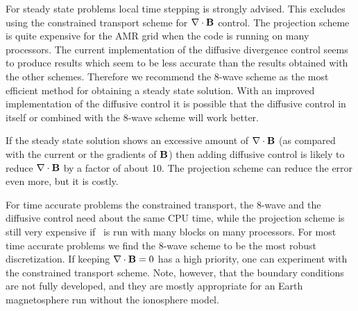 For steady state problems local time stepping is strongly 
advised. This excludes using the constrained transport scheme
for $\nabla\cdot\mathbf{B}$ control. The projection scheme is quite expensive
for the AMR grid when the code is running on many processors.
The current implementation of the diffusive divergence control
seems to produce results which seem to be less accurate than the
results obtained with the other schemes. 
Therefore we recommend the 8-wave scheme as the most efficient method 
for obtaining a steady state solution.
With an improved implementation of the diffusive control it is
possible that the diffusive control in itself or combined with the
8-wave scheme will work better. 

If the steady state solution shows an excessive amount of $\nabla\cdot\mathbf{B}$
(as compared with the current or the gradients of $\mathbf{B}$) then 
adding diffusive control is likely to reduce $\nabla\cdot\mathbf{B}$ by a factor
of about 10. The projection scheme can reduce the error even more, 
but it is costly.

For time accurate problems the constrained transport, the 8-wave
and the diffusive control need about the same CPU time, while the
projection scheme is still very expensive if \BATSRUS\ is run
with many blocks on many processors.
For most time accurate problems we find the 8-wave scheme to be the 
most robust discretization. If keeping $\nabla\cdot\mathbf{B}=0$ has a high priority,
one can experiment with the constrained transport scheme. Note, however,
that the boundary conditions are not fully developed, and they are 
mostly appropriate for an Earth magnetosphere run without the ionosphere
model.

